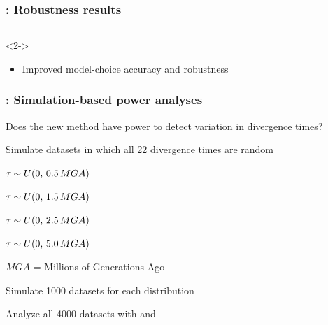 \begin{frame}
    \frametitle{\dppmsbayes: Robustness results}
    \begin{columns}
    \end{columns}

    \begin{uncoverenv}<2->
    \begin{itemize}
        \item Improved model-choice accuracy and robustness
    \end{itemize}
    \end{uncoverenv}
    \vspace{-0.5cm}
\end{frame}

\begin{frame}
    \frametitle{\dppmsbayes: Simulation-based power analyses}
    Does the new method have power to detect variation in divergence times?\\

    \bigskip
    \begin{myitemize}
        \item<2-> Simulate datasets in which all 22 divergence times are random
            \smallskip
            \begin{myitemize}
                \item $\tau_{} \sim U(0, \,0.5 \,MGA)$
                \smallskip
                \item $\tau_{} \sim U(0, \,1.5 \,MGA)$
                \smallskip
                \item $\tau_{} \sim U(0, \,2.5 \,MGA)$
                \smallskip
                \item $\tau_{} \sim U(0, \,5.0 \,MGA)$
                \smallskip
            \end{myitemize}
        \item<2-> $MGA$ = Millions of Generations Ago

        \item<3-> Simulate 1000 datasets for each \divTime{} distribution
        \item<3-> Analyze all 4000 datasets with \msb and \dppmsbayes
    \end{myitemize}
\end{frame}

